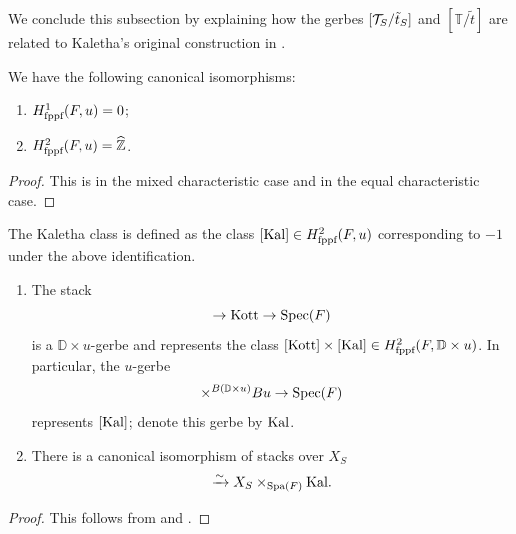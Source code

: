 We conclude this subsection by explaining how the gerbes $[\mathcal{T}_{S}/\tilde{t}_{S}]$ and $[\mathbb{T}/\tilde{t}]$ are related to Kaletha's original construction in \cite{Kal16}. 

\begin{prop}\label{prop:ucohom}
   We have the following canonical isomorphisms:
    \begin{enumerate}
       \item $H^{1}_{\textnormal{fppf}}(F, u) = 0$;
     \item $H^{2}_{\textnormal{fppf}}(F,u) = \widehat{\mathbb{Z}}$.
   \end{enumerate}
\end{prop}

\begin{proof}
    This is \cite[Theorem 3.1]{Kal16} in the mixed characteristic case and \cite[Theorem 3.4]{Dillery23} in the equal characteristic case.
\end{proof}

The Kaletha class is defined as the class $[\mathrm{Kal}] \in H^{2}_{\textnormal{fppf}}(F, u)$ corresponding to $-1$ under the above identification. 

\begin{prop}
\begin{enumerate}
\item{The stack 
\begin{equation*}
[\mathbb{T}/\tilde{t}] \to \mathrm{Kott} \to \Spec(F)
\end{equation*}
is a $\mathbb{D} \times u$-gerbe and represents the class $[\mathrm{Kott}] \times [\mathrm{Kal}] \in H_{\textnormal{fppf}}^{2}(F, \mathbb{D} \times u)$. In particular, the $u$-gerbe 
\begin{equation*}
[\mathbb{T}/\tilde{t}] \times^{B(\mathbb{D} \times u)} Bu\to \Spec(F)
\end{equation*}
represents $[\mathrm{Kal}]$; denote this gerbe by $\mathrm{Kal}$.}

    \item{There is a canonical isomorphism of stacks over $X_{S}$
    \begin{equation*}
        [\mc{T}_{S}/\tilde{t}_{S}] \xrightarrow{\sim} X_{S} \times_{\tn{Spa}(F)} \tn{Kal}.
    \end{equation*}}
    \end{enumerate}
\end{prop}

\begin{proof}
    This follows from \cite[Th\'{e}or\`{e}me 5.6]{Fargues22} and \cite[Corollaire 7.4]{Fargues22}.
\end{proof}

